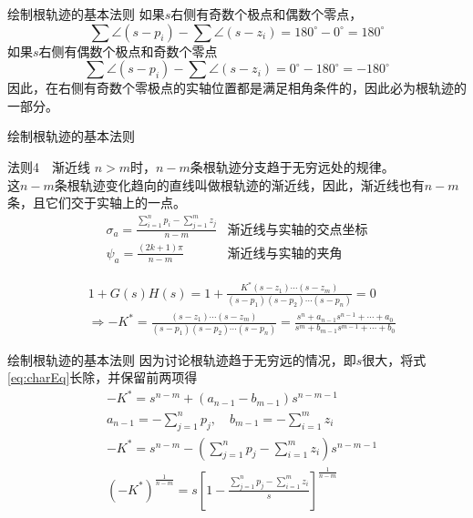 \documentclass[handout,cjkutf8,table,aspectratio=1610]{beamer} %
\begin{document}
\begin{frame}{绘制根轨迹的基本法则}
	如果$s$右侧有奇数个极点和偶数个零点，
	$$\sum\angle(s-p_i)-\sum\angle(s-z_i)=180^\circ-0^\circ=180^\circ$$
	如果$s$右侧有偶数个极点和奇数个零点
	$$\sum\angle(s-p_i)-\sum\angle(s-z_i)=0^\circ-180^\circ=-180^\circ$$
	因此，在右侧有奇数个零极点的实轴位置都是满足相角条件的，因此必为根轨迹的一部分。
\end{frame}

\begin{frame}{绘制根轨迹的基本法则}
	\begin{block}{法则4~~渐近线}
		$n > m$时，$n-m$条根轨迹分支趋于无穷远处的规律。\\
		这$n-m$条根轨迹变化趋向的\alert{直线}叫做根轨迹的渐近线，因此，渐近线也有$n-m$条，且它们\alert{交于实轴上的一点}。
         	\begin{align*}
			&\sigma_a=\frac{\sum_{i=1}^np_i-\sum_{j=1}^mz_j}{n-m} &\text{渐近线与实轴的交点坐标}&\\
			&\psi_a=\frac{(2k+1)\pi}{n-m}&\text{渐近线与实轴的夹角}&
		\end{align*}
	\end{block}
	\vs{-1em}
	\begin{align}
	&1+G(s)H(s)=1+\frac{K^*(s-z_1)\cdots(s-z_m)}{(s-p_1)(s-p_2)\cdots(s-p_n)}=0\nonumber\\
	&\Rightarrow -K^*=\frac{(s-z_1)\cdots(s-z_m)}{(s-p_1)(s-p_2)\cdots(s-p_n)}=\frac{s^n+a_{n-1}s^{n-1}+\cdots+a_0}{s^m+b_{m-1}s^{m-1}+\cdots+b_0}\label{eq:charEq}
	\end{align}
\end{frame}

\begin{frame}{绘制根轨迹的基本法则}
	因为讨论根轨迹趋于无穷远的情况，即$s$很大，将式\eqref{eq:charEq}长除，并保留前两项得
	\begin{align}
		&-K^* = s^{n-m} + (a_{n-1}-b_{m-1})s^{n-m-1}\\
		&a_{n-1}=-\sum_{j=1}^n p_j,\quad b_{m-1}=-\sum_{i=1}^m z_i\nonumber\\
		&-K^* = s^{n-m} - \left(\sum_{j=1}^n p_j-\sum_{i=1}^m z_i\right)s^{n-m-1}\\
		&(-K^*)^{\frac{1}{n-m}}=s\left[1-\frac{\sum_{j=1}^n p_j-\sum_{i=1}^m z_i}{s}\right]^{\frac{1}{n-m}}\label{eq:KRoot}
	\end{align}
\end{frame}
\end{document}
